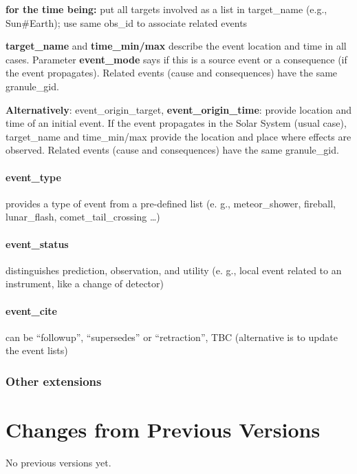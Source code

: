 \documentclass[11pt,a4paper]{ivoa}
\begin{document}
\textbf{for the time being:} put all targets involved as a list in target\_name (e.g., Sun\#Earth); use same obs\_id to associate related events

\textbf{ target\_name }and\textbf{ time\_min/max} describe the event location and time in all cases. Parameter \textbf{event\_mode} says if this is a source event or a consequence (if the event propagates). Related events (cause and consequences) have the same granule\_gid.

\textbf{}\textbf{Alternatively}: event\_origin\_target, \textbf{event\_origin\_time}: provide location and time of an initial event. If the event propagates in the Solar System (usual case), target\_name and time\_min/max provide the location and place where effects are observed. Related events (cause and consequences) have the same granule\_gid.

\paragraph{event\_type}

provides a type of event from a pre-defined list (e. g., meteor\_shower, fireball, lunar\_flash, comet\_tail\_crossing …)

\paragraph{event\_status}

distinguishes prediction, observation, and utility (e. g., local event related to an instrument, like a change of detector)

\paragraph{event\_cite}

can be ``followup'', ``supersedes'' or ``retraction'', TBC (alternative is to update the event lists)

\subsubsection{Other extensions\\}



\appendix
\section{Changes from Previous Versions}

No previous versions yet.  



\end{document}
